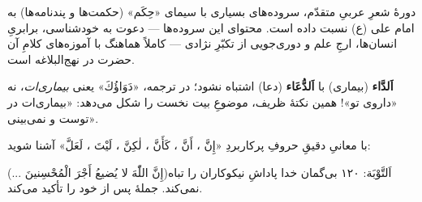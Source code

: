 \begin{JGood}
دورةٔ شعرِ عربیِ متقدّم، سروده‌های بسیاری با سیمای «حِکَم» (حکمت‌ها و
پندنامه‌ها) به امام علی (ع) نسبت داده است. محتوای این سروده‌ها — دعوت به
خودشناسی، برابریِ انسان‌ها، ارجِ علم و دوری‌جویی از تکبّرِ نژادی — کاملاً
هماهنگ با آموزه‌های کلامِ آن حضرت در نهج‌البلاغه است.
\end{JGood}


\begin{JMTable}
\end{JMTable}

\begin{JNokte}
\textbf{اَلدَّاء} (بیماری) با \textbf{اَلدُّعَاء} (دعا) اشتباه نشود؛ در ترجمه،
«دَوَاؤُكَ» یعنی \emph{بیماری‌ات}، نه «داروی تو»! همین نکتهٔ ظریف، موضوعِ بیت
نخست را شکل می‌دهد: «بیماری‌ات در توست و نمی‌بینی».
\end{JNokte}




با معانیِ دقیقِ حروفِ پرکاربردِ «إِنَّ ، أَنَّ ، كَأَنَّ ، لٰكِنَّ ، لَيْتَ ،
لَعَلَّ» آشنا شوید:

{(... إِنَّ اللّٰهَ لا يُضيعُ أَجْرَ الْمُحْسِنينَ)}{اَلتَّوْبَة: ١٢٠}
{بی‌گمان خدا پاداشِ نیکوکاران را تباه نمی‌کند.}
{جملهٔ پس از خود را تأکید می‌کند.}

